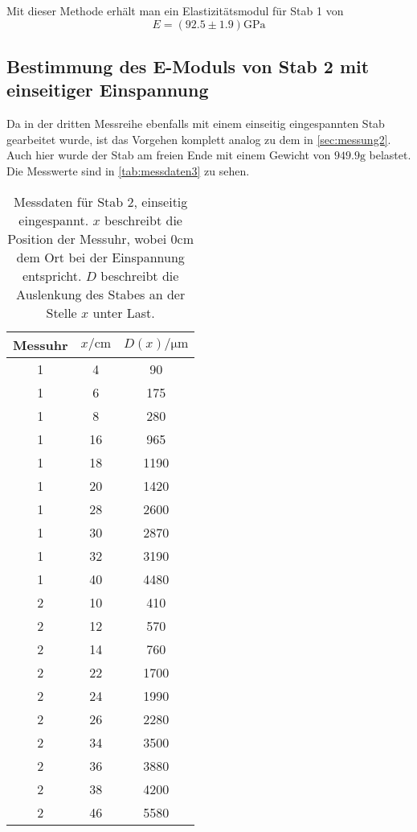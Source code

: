 Mit dieser Methode erhält man ein Elastizitätsmodul für Stab 1 von
\begin{equation}
	E = (92.5 \pm 1.9) \si{\giga\pascal}
	\label{eqn:E-messung2}
\end{equation}

\subsection{Bestimmung des E-Moduls von Stab 2 mit einseitiger Einspannung}
\label{sec:messung3}

Da in der dritten Messreihe ebenfalls mit einem einseitig eingespannten Stab gearbeitet
wurde, ist das Vorgehen komplett analog zu dem in \autoref{sec:messung2}. Auch hier wurde
der Stab am freien Ende mit einem Gewicht von $949.9\si{\gram}$ belastet.
\\
Die Messwerte sind in \autoref{tab:messdaten3} zu sehen.

\begin{table}
	\centering
	\caption{Messdaten für Stab 2, einseitig eingespannt. $x$ beschreibt
	die Position der Messuhr, wobei $0\si{\centi\meter}$
	dem Ort bei der Einspannung entspricht.
	$D$ beschreibt die Auslenkung des Stabes an der Stelle $x$ unter Last.}
	\label{tab:messdaten3}
	\begin{tabular}{c c c}
	\toprule
	Messuhr &
	$x / \si{\centi\meter}$ &
	$D(x) / \si{\micro\meter}$
	\\
	\midrule
	1 & 4 & 90 \\
	1 & 6 & 175 \\
	1 & 8 & 280 \\
	1 & 16 & 965 \\
	1 & 18 & 1190 \\
	1 & 20 & 1420 \\
	1 & 28 & 2600 \\
	1 & 30 & 2870 \\
	1 & 32 & 3190 \\
	1 & 40 & 4480 \\
	2 & 10 & 410 \\
	2 & 12 & 570 \\
	2 & 14 & 760 \\
	2 & 22 & 1700 \\
	2 & 24 & 1990 \\
	2 & 26 & 2280 \\
	2 & 34 & 3500 \\
	2 & 36 & 3880 \\
	2 & 38 & 4200 \\
	2 & 46 & 5580 \\
	\bottomrule
\end{tabular}
\end{table}

